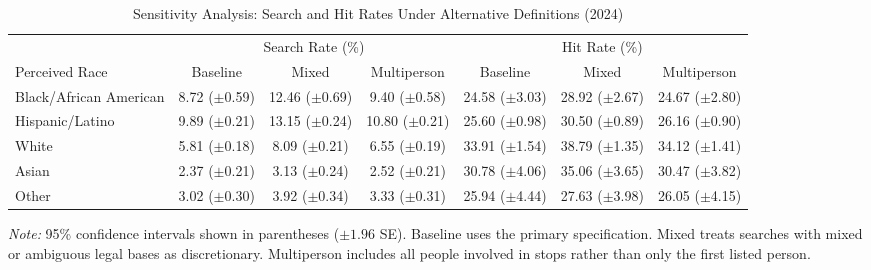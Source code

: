 \begin{table}[H]
\centering
\caption{Sensitivity Analysis: Search and Hit Rates Under Alternative Definitions (2024)}
\label{tab:sensitivity_combined}
\begin{tabular}{l ccc ccc}
\toprule
 & \multicolumn{3}{c}{Search Rate (\%)} & \multicolumn{3}{c}{Hit Rate (\%)} \\
\cmidrule(lr){2-4} \cmidrule(lr){5-7}
Perceived Race & Baseline & Mixed & Multiperson & Baseline & Mixed & Multiperson \\
\midrule
Black/African American & 8.72 ({\scriptsize $\pm$0.59}) & 12.46 ({\scriptsize $\pm$0.69}) & 9.40 ({\scriptsize $\pm$0.58}) & 24.58 ({\scriptsize $\pm$3.03}) & 28.92 ({\scriptsize $\pm$2.67}) & 24.67 ({\scriptsize $\pm$2.80}) \\
Hispanic/Latino & 9.89 ({\scriptsize $\pm$0.21}) & 13.15 ({\scriptsize $\pm$0.24}) & 10.80 ({\scriptsize $\pm$0.21}) & 25.60 ({\scriptsize $\pm$0.98}) & 30.50 ({\scriptsize $\pm$0.89}) & 26.16 ({\scriptsize $\pm$0.90}) \\
White & 5.81 ({\scriptsize $\pm$0.18}) & 8.09 ({\scriptsize $\pm$0.21}) & 6.55 ({\scriptsize $\pm$0.19}) & 33.91 ({\scriptsize $\pm$1.54}) & 38.79 ({\scriptsize $\pm$1.35}) & 34.12 ({\scriptsize $\pm$1.41}) \\
Asian & 2.37 ({\scriptsize $\pm$0.21}) & 3.13 ({\scriptsize $\pm$0.24}) & 2.52 ({\scriptsize $\pm$0.21}) & 30.78 ({\scriptsize $\pm$4.06}) & 35.06 ({\scriptsize $\pm$3.65}) & 30.47 ({\scriptsize $\pm$3.82}) \\
Other & 3.02 ({\scriptsize $\pm$0.30}) & 3.92 ({\scriptsize $\pm$0.34}) & 3.33 ({\scriptsize $\pm$0.31}) & 25.94 ({\scriptsize $\pm$4.44}) & 27.63 ({\scriptsize $\pm$3.98}) & 26.05 ({\scriptsize $\pm$4.15}) \\
\bottomrule
\end{tabular}
\smallskip
\parbox{\textwidth}{\footnotesize \textit{Note:} 95\% confidence intervals shown in parentheses ($\pm 1.96$ SE). Baseline uses the primary specification. Mixed treats searches with mixed or ambiguous legal bases as discretionary. Multiperson includes all people involved in stops rather than only the first listed person.}
\end{table}